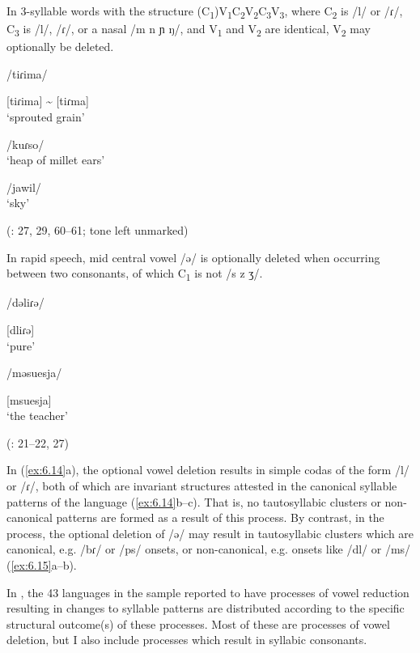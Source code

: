 \ea\label{ex:6.14}

  In 3-syllable words with the structure (C\textsubscript{1})V\textsubscript{1}C\textsubscript{2}V\textsubscript{2}C\textsubscript{3}V\textsubscript{3}, where C\textsubscript{2} is /l/ or /ɾ/, C\textsubscript{3} is /l/, /ɾ/, or a nasal /m n ɲ ŋ/, and V\textsubscript{1} and V\textsubscript{2} are identical, V\textsubscript{2} may optionally be deleted.

\ea  /tiɾima/

[tiɾima] {\textasciitilde} [tiɾma]\\
\glt ‘sprouted grain’

\ex  /kuɾso/\\
\glt ‘heap of millet ears’

\ex  /jawil/\\
\glt ‘sky’

(\citealt{Jakobi1990}: 27, 29, 60--61; tone left unmarked)
\z
\z

\ea\label{ex:6.15}

  In rapid speech, mid central vowel /ə/ is optionally deleted when occurring between two consonants, of which C\textsubscript{1} is not /s z ʒ/.

\ea  /dəliɾə/

[dliɾə]\\
\glt ‘pure’

\ex  /məsuesja/

[msuesja]\\
\glt ‘the teacher’

(\citealt{Klippenstein2010}: 21--22, 27)
\z
\z

  In  (\ref{ex:6.14}a), the optional vowel deletion results in simple codas of the form /l/ or /ɾ/, both of which are invariant structures attested in the canonical syllable patterns of the language (\ref{ex:6.14}b--c). That is, no tautosyllabic clusters or non-canonical patterns are formed as a result of this process. By contrast, in the  process, the optional deletion of /ə/ may result in tautosyllabic clusters which are canonical, e.g. /bɾ/ or /ps/ onsets, or non-canonical, e.g. onsets like /dl/ or /ms/ (\ref{ex:6.15}a--b).

  In , the 43 languages in the sample reported to have processes of vowel reduction resulting in changes to syllable patterns are distributed according to the specific structural outcome(s) of these processes. Most of these are processes of vowel deletion, but I also include processes which result in syllabic consonants.

